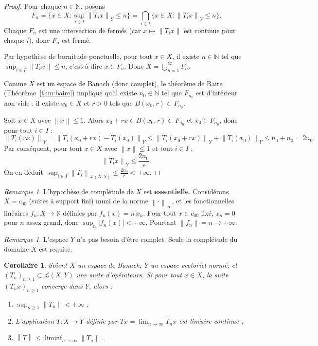\documentclass[a4paper,12pt]{book}
\newcommand{\N}{\mathbb{N}}
\newcommand{\K}{\mathbb{K}}
\newcommand{\norm}[1]{\left\| #1 \right\|}
\newcommand{\abs}[1]{\left| #1 \right|}
\theoremstyle{definition}
\theoremstyle{plain}
\newtheorem{corollaire}[definition]{Corollaire}
\theoremstyle{remark}
\newtheorem{remarque}[definition]{Remarque}
\begin{document}
\begin{proof}
Pour chaque $n \in \N$, posons
\[
  F_n = \bigl\{ x \in X : \sup_{i \in I} \norm{T_i x}_Y \leq n \bigr\}
  = \bigcap_{i \in I} \bigl\{ x \in X : \norm{T_i x}_Y \leq n \bigr\}.
\]
Chaque $F_n$ est une intersection de fermés (car $x \mapsto \norm{T_i x}$ est
continue pour chaque $i$), donc $F_n$ est fermé.

Par hypothèse de bornitude ponctuelle, pour tout $x \in X$, il existe $n \in \N$
tel que $\sup_{i \in I} \norm{T_i x} \leq n$, c'est-à-dire $x \in F_n$. Donc
$X = \bigcup_{n=1}^{\infty} F_n$.

Comme $X$ est un espace de Banach (donc complet), le théorème de Baire
(Théorème~\ref{thm:baire}) implique qu'il existe $n_0 \in \N$ tel que $F_{n_0}$
est d'intérieur non vide : il existe $x_0 \in X$ et $r > 0$ tels que
$B(x_0, r) \subset F_{n_0}$.

Soit $x \in X$ avec $\norm{x} \leq 1$. Alors $x_0 + rx \in B(x_0, r) \subset F_{n_0}$
et $x_0 \in F_{n_0}$, donc pour tout $i \in I$ :
\[
  \norm{T_i(rx)}_Y = \norm{T_i(x_0 + rx) - T_i(x_0)}_Y
  \leq \norm{T_i(x_0 + rx)}_Y + \norm{T_i(x_0)}_Y
  \leq n_0 + n_0 = 2n_0.
\]
Par conséquent, pour tout $x \in X$ avec $\norm{x} \leq 1$ et tout $i \in I$ :
\[
  \norm{T_i x}_Y \leq \frac{2n_0}{r}.
\]
On en déduit $\sup_{i \in I} \norm{T_i}_{\mathcal{L}(X,Y)} \leq \frac{2n_0}{r} < +\infty$.
\end{proof}

\begin{remarque}
\label{rem:BS-hypotheses}
L'hypothèse de complétude de $X$ est \textbf{essentielle}. Considérons
$X = c_{00}$ (suites à support fini) muni de la norme $\norm{\cdot}_\infty$,
et les fonctionnelles linéaires $f_n : X \to \K$ définies par
$f_n(x) = n\, x_n$. Pour tout $x \in c_{00}$ fixé, $x_n = 0$ pour $n$ assez grand,
donc $\sup_n \abs{f_n(x)} < +\infty$. Pourtant $\norm{f_n} = n \to +\infty$.
\end{remarque}

\begin{remarque}
\label{rem:BS-Y-norme}
L'espace $Y$ n'a pas besoin d'être complet. Seule la complétude du
domaine $X$ est requise.
\end{remarque}

\begin{corollaire}
\label{cor:BS-convergence}
Soient $X$ un espace de Banach, $Y$ un espace vectoriel normé, et
$(T_n)_{n \geq 1} \subset \mathcal{L}(X,Y)$ une suite d'opérateurs.
Si pour tout $x \in X$, la suite $(T_n x)_{n \geq 1}$ converge dans $Y$,
alors :
\begin{enumerate}[label=(\roman*)]
  \item $\sup_{n \geq 1} \norm{T_n} < +\infty$ ;
  \item L'application $T : X \to Y$ définie par $Tx = \lim_{n \to \infty} T_n x$
    est linéaire continue ;
  \item $\norm{T} \leq \liminf_{n \to \infty} \norm{T_n}$.
\end{enumerate}
\end{corollaire}
\end{document}
